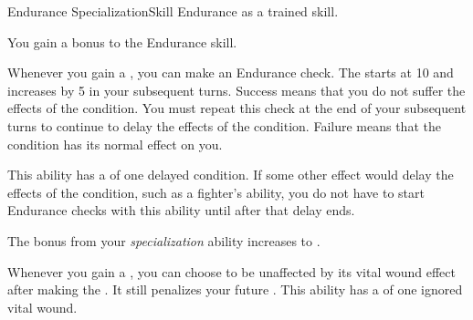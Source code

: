   \begin{feat}{Endurance Specialization}{Skill}
    \featpre Endurance as a trained skill.

     You gain a  bonus to the Endurance skill.

     Whenever you gain a , you can make an Endurance check.
    The  starts at 10 and increases by 5 in your subsequent turns.
    Success means that you do not suffer the effects of the condition.
    You must repeat this check at the end of your subsequent turns to continue to delay the effects of the condition.
    Failure means that the condition has its normal effect on you.

    This ability has a  of one delayed condition.
    If some other effect would delay the effects of the condition, such as a fighter's  ability, you do not have to start Endurance checks with this ability until after that delay ends.

     The bonus from your \textit{specialization} ability increases to .

     Whenever you gain a , you can choose to be unaffected by its vital wound effect after making the .
    It still penalizes your future .
    This ability has a  of one ignored vital wound.
  \end{feat}

